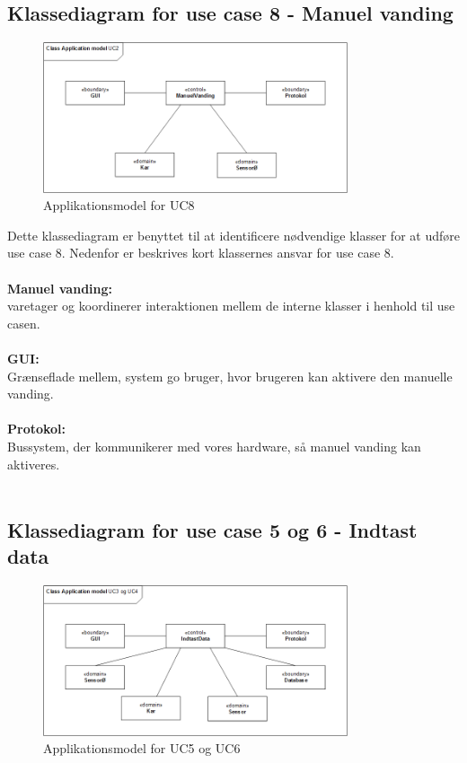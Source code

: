 \subsection{Klassediagram for use case 8 - Manuel vanding}
\begin{figure}[H]
    \centering
    \includegraphics[width=0.8\textwidth]{Systemarkitektur/KlasseDiagrammer/8_ManuelVanding.png}
    \caption{Applikationsmodel for UC8}
    \label{fig:app_uc8}
\end{figure}

Dette klassediagram er benyttet til at identificere nødvendige klasser for at udføre use case 8.
Nedenfor er beskrives kort klassernes ansvar for use case 8.
\\\\
\textbf{Manuel vanding:}\\
varetager og koordinerer interaktionen mellem de interne klasser i henhold til use casen.
\\\\
\textbf{GUI:}\\
Grænseflade mellem, system go bruger, hvor brugeren kan aktivere den manuelle vanding. 
\\\\
\textbf{Protokol:}\\
Bussystem, der kommunikerer med vores hardware, så manuel vanding kan aktiveres.
\\\\

\subsection{Klassediagram for use case 5 og 6 - Indtast data}

\begin{figure}[H]
    \centering
    \includegraphics[width=0.8\textwidth]{Systemarkitektur/KlasseDiagrammer/5+6_IndtastData.png}
    \caption{Applikationsmodel for UC5 og UC6}
    \label{fig:app_uc56}
\end{figure}

